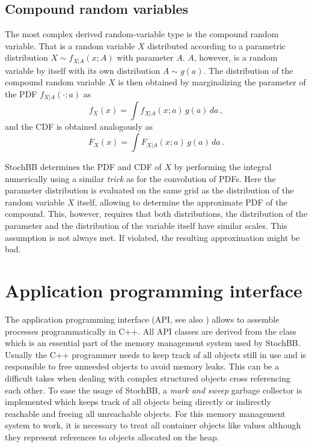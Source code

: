 \documentclass[a4paper, 10pt]{paper}
\begin{document}
\subsection{Compound random variables}
The most complex derived random-variable type is the compound random variable. That is a random variable
$X$ distributed according to a parametric distribution $X\sim f_{X|A}(x;A)$ with parameter $A$. $A$, however, 
is a random variable by itself with its own distribution $A\sim g(a)$. The distribution of the compound 
random variable $X$ is then obtained by marginalizing the parameter of the PDF $f_{X|A}(\cdot;a)$ as 
\begin{equation}
 f_X(x) = \int f_{X|A}(x;a)\,g(a)\,da\,,\nonumber
\end{equation}
and the CDF is obtained analogously as
\begin{equation}
 F_X(x) = \int F_{X|A}(x;a)\,g(a)\,da\,.\nonumber
\end{equation}

StochBB determines the PDF and CDF of $X$ by performing the integral numerically using a similar \emph{trick}
as for the convolution of PDFs. Here the parameter distribution is evaluated on the same grid as the distribution
of the random variable $X$ itself, allowing to determine the approximate PDF of the compound. This, however, requires 
that both distributions, the distribution of the parameter and the distribution of the variable itself have similar 
scales. This assumption is not always met. If violated, the resulting approximation might be bad.


\section{Application programming interface} \label{sec:api}
The application programming interface (API, see also \cite{stochbbapi}) allows to assemble processes
programmatically in C++.
All API classes are derived from the  class which is an essential part of the
memory management system used by StochBB. Usually the C++ programmer needs to keep track of all
objects still in use and is responsible to free unneeded objects to avoid memory leaks. This can
be a difficult takes when dealing with complex structured objects cross referencing each other.
To ease the usage of StochBB, a \emph{mark and sweep} garbage collector is implemented which keeps track
of all objects being directly or indirectly reachable and freeing all unreachable objects. For
this memory management system to work, it is necessary to treat all container objects like values
although they represent references to objects allocated on the heap.
\end{document}
